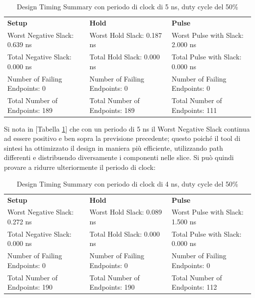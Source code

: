 \begin{table}[h!]
    \centering \scriptsize
    \begin{tabular}{p{4.8cm}p{4.8cm}p{4.8cm}}
        \hline
        \textbf{Setup} & \textbf{Hold} & \textbf{Pulse} \\
        Worst Negative Slack: \hfill 0.639 ns &
        Worst Hold Slack: \hfill 0.187 ns &
        Worst Pulse with Slack: \hfill 2.000 ns \\
        Total Negative Slack: \hfill 0.000 ns &
        Total Hold Slack: \hfill 0.000 ns &
        Total Pulse with Slack: \hfill 0.000 ns \\
        Number of Failing Endpoints: \hfill 0 &
        Number of Failing Endpoints: \hfill 0 &
        Number of Failing Endpoints: \hfill 0 \\
        Total Number of Endpoints: \hfill 189 &
        Total Number of Endpoints: \hfill 189 &
        Total Number of Endpoints: \hfill 111 \\
        \hline
    \end{tabular}
    \caption{Design Timing Summary con periodo di clock di 5 ns, duty cycle del 50\%}
    \label{tab:timing_analysis_5ns}
\end{table}

Si nota in [Tabella \ref{tab:timing_analysis_5ns}] che con un periodo di 5 ns il Worst Negative Slack continua ad essere positivo e ben sopra la previsione precedente; questo poiché il tool di sintesi ha ottimizzato il design in maniera più efficiente, utilizzando path differenti e distribuendo diversamente i componenti nelle slice. Si può quindi provare a ridurre ulteriormente il periodo di clock:

\begin{table}[h!]
    \centering \scriptsize
    \begin{tabular}{p{4.8cm}p{4.8cm}p{4.8cm}}
        \hline
        \textbf{Setup} & \textbf{Hold} & \textbf{Pulse} \\
        Worst Negative Slack: \hfill 0.272 ns &
        Worst Hold Slack: \hfill 0.089 ns &
        Worst Pulse with Slack: \hfill 1.500 ns \\
        Total Negative Slack: \hfill 0.000 ns &
        Total Hold Slack: \hfill 0.000 ns &
        Total Pulse with Slack: \hfill 0.000 ns \\
        Number of Failing Endpoints: \hfill 0 &
        Number of Failing Endpoints: \hfill 0 &
        Number of Failing Endpoints: \hfill 0 \\
        Total Number of Endpoints: \hfill 190 &
        Total Number of Endpoints: \hfill 190 &
        Total Number of Endpoints: \hfill 112 \\
        \hline
    \end{tabular}
    \caption{Design Timing Summary con periodo di clock di 4 ns, duty cycle del 50\%}
    \label{tab:timing_analysis_4ns}
\end{table}

